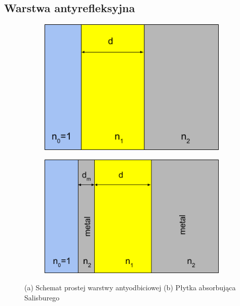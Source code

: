 \subsection{Warstwa antyrefleksyjna}
\begin{figure}[tb]
	\centering
        \begin{subfigure}{0.42\textwidth}
		\includegraphics[width=\textwidth]{images/pml/antiref.png}
                \caption{}
		\label{fig:antyref}
        \end{subfigure}
        \begin{subfigure}{0.47\textwidth}
                \includegraphics[width=\textwidth]{images/pml/sailsbury.png}
                \caption{}
		\label{fig:sailsburyschem}
        \end{subfigure}
        \caption{(a) Schemat prostej warstwy antyodbiciowej  (b) Płytka absorbująca Salisburego}
\end{figure}



